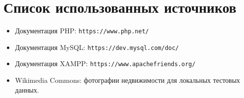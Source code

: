\documentclass[12pt,a4paper]{article}
\begin{document}
\section{Список использованных источников}

\begin{itemize}
  \item Документация PHP: \texttt{https://www.php.net/}
  \item Документация MySQL: \texttt{https://dev.mysql.com/doc/}
  \item Документация XAMPP: \texttt{https://www.apachefriends.org/}
  \item Wikimedia Commons: фотографии недвижимости для локальных тестовых данных.
\end{itemize}
\end{document}
